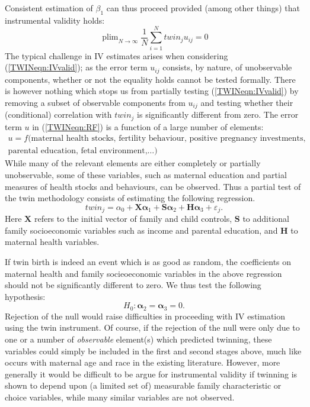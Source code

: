 \documentclass[subeqn]{article}
\DeclareMathOperator{\plim}{plim}
\begin{document}
\begin{spacing}{1.4}
Consistent estimation of $\beta_1$ can thus proceed provided (among other
things) that instrumental validity holds:
\begin{equation}
\label{TWINeqn:IVvalid}
\plim_{N\to \infty} \frac{1}{N}\sum_{i=1}^N twin_ju_{ij}=0
\end{equation}
The typical challenge in IV estimates arises when considering 
(\ref{TWINeqn:IVvalid}); as the error term $u_{ij}$ consists, by nature, of 
unobservable components, whether or not the equality holds cannot be tested 
formally.  There is however nothing which stops us from partially testing 
(\ref{TWINeqn:IVvalid}) by removing a subset of observable components from $u_{ij}$
and testing whether their (conditional) correlation with $twin_j$ is 
significantly different from zero. The error term $u$ in (\ref{TWINeqn:RF}) 
is a function of a large number of elements:
\begin{equation}
\label{TWINeqn:IVbias}
\begin{split}
u=f(\text{maternal health stocks, fertility behaviour, positive pregnancy investments,}  \\
\text{parental education, fetal environment,}\ldots)
\end{split}
\end{equation}
While many of the relevant elements are either completely or partially 
unobservable, some of these variables, such as maternal education and partial 
measures of health stocks and behaviours, can be observed.  Thus a partial test 
of the twin methodology consists of estimating the following regression.
\begin{equation}
\label{TWINeqn:twinreg}
twin_{j}=\alpha_0 + \bm{X}\bm{\alpha}_1 + \bm{S}\bm{\alpha}_2
                  + \bm{H}\bm{\alpha}_3 + \varepsilon_{j}.
\end{equation}
Here $\bm{X}$ refers to the initial vector of family and child controls, $\bm{S}$
to additional family socioeconomic variables such as income and parental 
education, and $\bm{H}$ to maternal health variables.  

If twin birth is indeed an event which is as good as random, the coefficients
on maternal health and family socieoeconomic variables in the above regression
should not be significantly different to zero.  We thus test the following 
hypothesis:
\begin{equation}
\label{TWINeqn:twintest}
H_0: \bm{\alpha}_2 = \bm{\alpha}_3 = 0.
\end{equation}
Rejection of the null would raise difficulties in proceeding with IV estimation 
using the twin instrument. Of course, if the rejection of the null were only due 
to one or a number of \emph{observable} element(s) which predicted twinning, 
these variables could simply be included in the first and second stages above, 
much like occurs with maternal age and race in the existing literature.  However, 
more generally it would be difficult to be argue for instrumental validity if 
twinning is shown to depend upon (a limited set of) measurable family 
characteristic or choice variables, while many similar variables are not observed.


\end{spacing}
\end{document}
